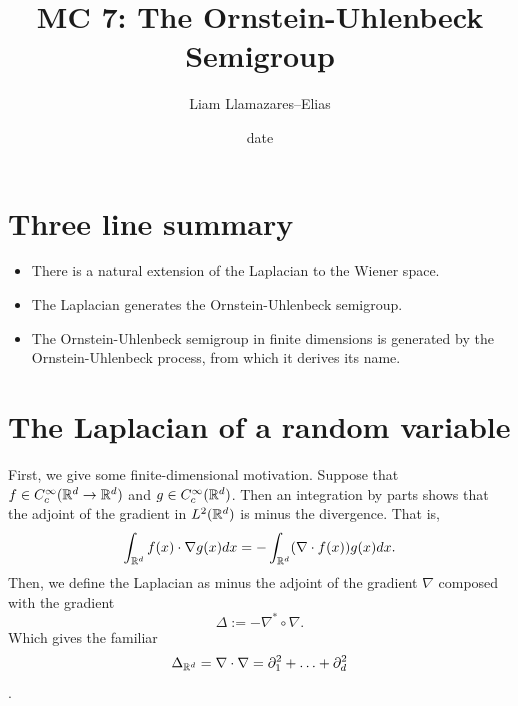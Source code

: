 \documentclass[
    a4paper,
    DIV=14,
    abstract=true,
    numbers=noenddot
]{scrartcl}
\begin{document}
	\title{MC 7: The Ornstein-Uhlenbeck Semigroup}
	\author{Liam Llamazares--Elias}
	\date{date}
	\maketitle
	\section{ Three line summary}
	\begin{itemize}
		\item There is a natural extension of the Laplacian to the Wiener space.
		\item The Laplacian generates the Ornstein-Uhlenbeck semigroup.
		\item The Ornstein-Uhlenbeck semigroup in finite dimensions is generated by the Ornstein-Uhlenbeck process, from which it derives its name.	\end{itemize}
	\section{The Laplacian of a random variable}
	First, we give some finite-dimensional motivation. Suppose that $f\in C_c^\infty(\mathbb{R}^d\to\mathbb{R}^d)$ and $g\in C_c^\infty(\mathbb{R}^d)$. Then an integration by parts shows that the adjoint of the gradient
	in $L^2(\mathbb{R}^d)$ is minus the divergence. That is,
	\begin{equation*}
		\int_{\mathbb{R}^d}f(x) \cdot \nabla g(x) dx=-\int_{\mathbb{R}^d}(\nabla\cdot  f(x)) g(x) dx.
	\end{equation*}
	Then, we define the Laplacian as minus the adjoint of the gradient $\nabla$ composed with the gradient
	\begin{equation*}
		\Delta := -\nabla^*\circ \nabla .
	\end{equation*}
	Which gives the familiar $$\Delta_{\mathbb{R}^d} =\nabla\cdot \nabla=\partial_1^2+\ldots+\partial _d^2$$.
\end{document}
